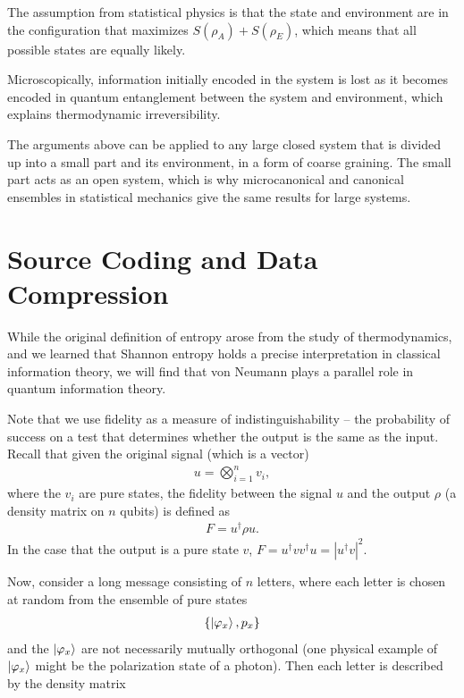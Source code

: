 \documentclass[a4paper, 12pt]{article}
\numberwithin{equation}{section}
\numberwithin{figure}{section}
\theoremstyle{definition}
\begin{document}
    The assumption from statistical physics is that the state and environment are in the configuration that maximizes $S(\rho_A) + S(\rho_E)$, which means that all possible states are equally likely. \par
    Microscopically, information initially encoded in the system is lost as it becomes encoded in quantum entanglement between the system and environment, which explains thermodynamic irreversibility. \par
    The arguments above can be applied to any large closed system that is divided up into a small part and its environment, in a form of coarse graining. The small part acts as an open system, which is why microcanonical and canonical ensembles in statistical mechanics give the same results for large systems.

    \section{Source Coding and Data Compression}
    While the original definition of entropy arose from the study of thermodynamics, and we learned that Shannon entropy holds a precise interpretation in classical information theory, we will find that von Neumann plays a parallel role in quantum information theory. \par
    Note that we use fidelity as a measure of indistinguishability -- the probability of success on a test that determines whether the output is the same as the input. Recall that given the original signal (which is a vector)
    \begin{align}
        u = \bigotimes_{i = 1}^n v_i,
    \end{align}
    where the $v_i$ are pure states, the fidelity between the signal $u$ and the output $\rho$ (a density matrix on $n$ qubits) is defined as
    \begin{align}
        F = u^\dagger \rho u.
    \end{align}
    In the case that the output is a pure state $v$, $F = u^\dagger vv^\dagger u = |u^\dagger v|^2$. \par
    Now, consider a long message consisting of $n$ letters, where each letter is chosen at random from the ensemble of pure states
    \begin{align}
        \{ \ket{\varphi_x}, p_x \}
    \end{align}
    and the $\ket{\varphi_x}$ are not necessarily mutually orthogonal (one physical example of $\ket{\varphi_x}$ might be the polarization state of a photon). Then each letter is described by the density matrix
\end{document}
